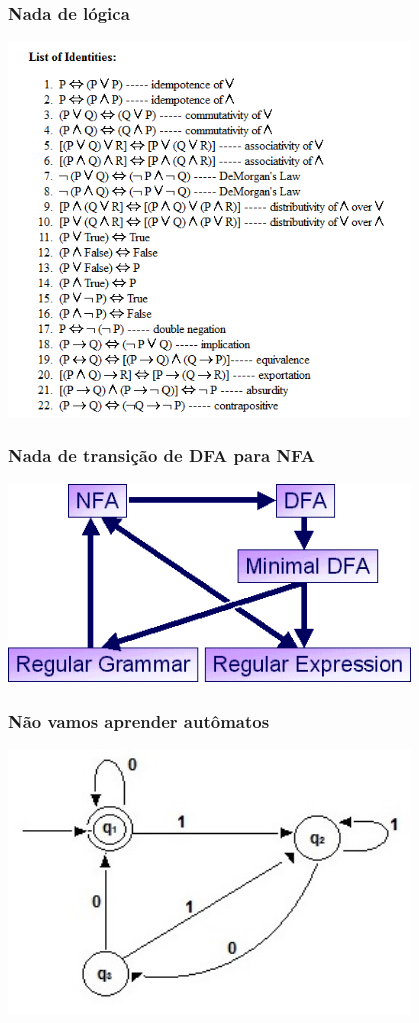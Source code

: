 \begin{frame}
\frametitle{Nada de lógica}
\centering
\includegraphics[width=0.8\textwidth]{./imagens/re/logica.png}
\end{frame}
\begin{frame}
\frametitle{Nada de transição de DFA para NFA}
\centering
\includegraphics[width=0.8\textwidth]{./imagens/re/NFA-DFA.png}
\end{frame}
\begin{frame}
\frametitle{Não vamos aprender autômatos}
\centering
\includegraphics[width=0.8\textwidth]{./imagens/re/NFA.jpg}
\end{frame}

